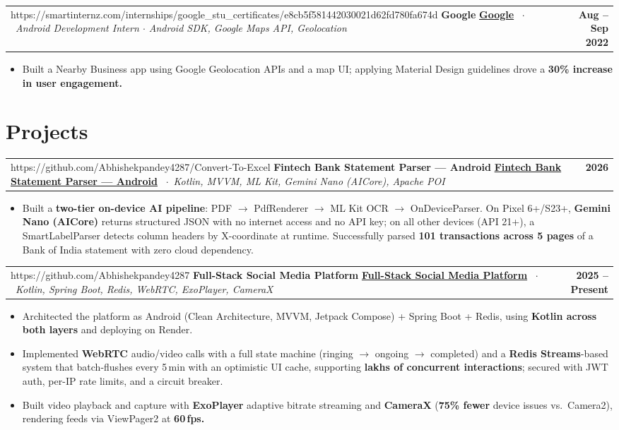 \documentclass[10pt, letterpaper]{article}
\makeatletter
\newcommand{\role}[4]{%
  \noindent
  \begin{tabularx}{\linewidth}{@{}X r@{}}
    \ifx\relax#2\relax
      {\small\bfseries\color{NavyTx}#1}
    \else
      {\small\bfseries\href{#2}{\color{BlueAc}#1}}%
    \fi
    {\footnotesize\color{MetaTx}\ $\cdot$\ \textit{#3}}
    &
    {\footnotesize\bfseries\color{NavyTx}#4}
  \end{tabularx}\vspace{0pt}%
}
\newenvironment{blist}{%
  \begin{itemize}[
    leftmargin=1.1em,
    itemsep=0pt,
    topsep=0pt,
    parsep=0pt,
    label={\textcolor{BlueAc}{\small$\bullet$}}
  ]\small\color{BodyTx}
}{%
  \end{itemize}\vspace{0pt}
}
\newcommand{\bn}[1]{{\bfseries\color{NavyTx}#1}}
\makeatother
\begin{document}
\role{Google}%
     {https://smartinternz.com/internships/google_stu_certificates/e8cb5f581442030021d62fd780fa674d}%
     {Android Development Intern $\cdot$ Android SDK, Google Maps API, Geolocation}%
     {Aug – Sep 2022}

\begin{blist}
  \item Built a Nearby Business app using Google Geolocation APIs and a map UI; applying
        Material Design guidelines drove a \bn{30\% increase in user engagement.}
\end{blist}

\section{Projects}

\role{Fintech Bank Statement Parser — Android}%
     {https://github.com/Abhishekpandey4287/Convert-To-Excel}%
     {Kotlin, MVVM, ML Kit, Gemini Nano (AICore), Apache POI}%
     {2026}

\begin{blist}
  \item Built a \bn{two-tier on-device AI pipeline}: PDF $\to$ PdfRenderer $\to$ ML Kit OCR $\to$
        OnDeviceParser. On Pixel 6+/S23+, \bn{Gemini Nano (AICore)} returns structured JSON with no
        internet access and no API key; on all other devices (API 21+), a SmartLabelParser detects
        column headers by X-coordinate at runtime. Successfully parsed
        \bn{101 transactions across 5 pages} of a Bank of India statement with zero cloud dependency.
\end{blist}

\role{Full-Stack Social Media Platform}%
     {https://github.com/Abhishekpandey4287}%
     {Kotlin, Spring Boot, Redis, WebRTC, ExoPlayer, CameraX}%
     {2025 – Present}

\begin{blist}
  \item Architected the platform as Android (Clean Architecture, MVVM, Jetpack Compose) + Spring Boot
        + Redis, using \bn{Kotlin across both layers} and deploying on Render.

  \item Implemented \bn{WebRTC} audio/video calls with a full state machine
        (ringing $\to$ ongoing $\to$ completed) and a \bn{Redis Streams}-based system that
        batch-flushes every 5\,min with an optimistic UI cache, supporting
        \bn{lakhs of concurrent interactions}; secured with JWT auth, per-IP rate limits, and a
        circuit breaker.

  \item Built video playback and capture with \bn{ExoPlayer} adaptive bitrate streaming and
        \bn{CameraX} (\bn{75\% fewer} device issues vs.\ Camera2), rendering feeds via ViewPager2
        at \bn{60\,fps.}
\end{blist}
\end{document}
